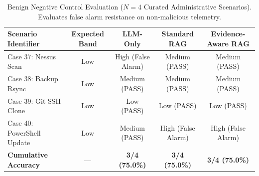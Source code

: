 \begin{table}[t]
\centering
\small
\caption{Benign Negative Control Evaluation ($N = 4$ Curated Administrative Scenarios). Evaluates false alarm resistance on non-malicious telemetry.}
\label{tab:benign_controls}
\begin{tabular}{lcccc}
\toprule
\textbf{Scenario Identifier} & \textbf{Expected Band} & \textbf{LLM-Only} & \textbf{Standard RAG} & \textbf{Evidence-Aware RAG} \\
\midrule
Case 37: Nessus Scan & Low & High (False Alarm) & Medium (PASS) & Medium (PASS) \\
Case 38: Backup Rsync & Low & Medium (PASS) & Medium (PASS) & Medium (PASS) \\
Case 39: Git SSH Clone & Low & Low (PASS) & Low (PASS) & Low (PASS) \\
Case 40: PowerShell Update & Low & Medium (PASS) & High (False Alarm) & High (False Alarm) \\
\midrule
\textbf{Cumulative Accuracy} & --- & \textbf{3/4 (75.0\%)} & \textbf{3/4 (75.0\%)} & \textbf{3/4 (75.0\%)} \\
\bottomrule
\end{tabular}
\end{table}
